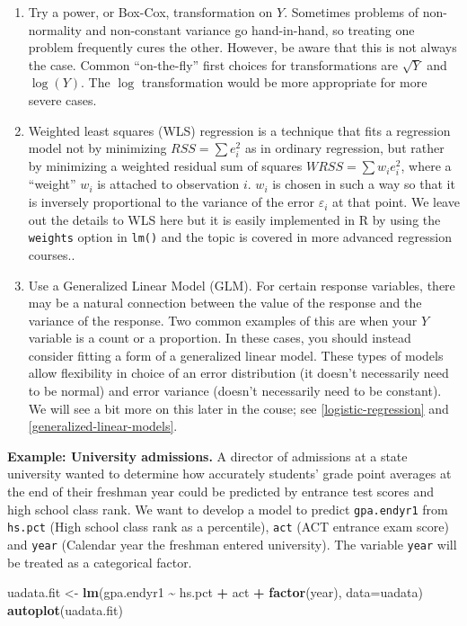 \documentclass[
]{book}
\newenvironment{Shaded}{\begin{snugshade}}{\end{snugshade}}
\newcommand{\AttributeTok}[1]{\textcolor[rgb]{0.13,0.29,0.53}{#1}}
\newcommand{\FunctionTok}[1]{\textcolor[rgb]{0.13,0.29,0.53}{\textbf{#1}}}
\newcommand{\NormalTok}[1]{#1}
\newcommand{\OtherTok}[1]{\textcolor[rgb]{0.56,0.35,0.01}{#1}}
\newcommand{\SpecialCharTok}[1]{\textcolor[rgb]{0.81,0.36,0.00}{\textbf{#1}}}
\begin{document}
\begin{enumerate}
\def\labelenumi{\arabic{enumi}.}
\item
  Try a power, or Box-Cox, transformation on \(Y\). Sometimes problems of non-normality and non-constant variance go hand-in-hand, so treating one problem frequently cures the other. However, be aware that this is not always the case. Common ``on-the-fly'' first choices for transformations are \(\sqrt{Y}\) and \(\log(Y)\). The \(\log\) transformation would be more appropriate for more severe cases.
\item
  Weighted least squares (WLS) regression is a technique that fits a regression model not by minimizing \(RSS = \sum e_i^2\) as in ordinary regression, but rather by minimizing a weighted residual sum of squares \(WRSS = \sum w_i e_i^2\), where a ``weight'' \(w_i\) is attached to observation \(i\). \(w_i\) is chosen in such a way so that it is inversely proportional to the variance of the error \(\varepsilon_i\) at that point. We leave out the details to WLS here but it is easily implemented in R by using the \texttt{weights} option in \texttt{lm()} and the topic is covered in more advanced regression courses..
\item
  Use a Generalized Linear Model (GLM). For certain response variables, there may be a natural connection between the value of the response and the variance of the response. Two common examples of this are when your \(Y\) variable is a count or a proportion. In these cases, you should instead consider fitting a form of a generalized linear model. These types of models allow flexibility in choice of an error distribution (it doesn't necessarily need to be normal) and error variance (doesn't necessarily need to be constant). We will see a bit more on this later in the couse; see \ref{logistic-regression} and \ref{generalized-linear-models}.
\end{enumerate}

\textbf{Example: University admissions.} A director of admissions at a state university wanted to determine how accurately students' grade point averages at the end of their freshman year could be predicted by entrance test scores and high school class rank. We want to develop a model to predict \texttt{gpa.endyr1} from \texttt{hs.pct} (High school class rank as a percentile), \texttt{act} (ACT entrance exam score) and \texttt{year} (Calendar year the freshman entered university). The variable \texttt{year} will be treated as a categorical factor.

\begin{Shaded}
\begin{Highlighting}[]
\NormalTok{uadata.fit }\OtherTok{\textless{}{-}} \FunctionTok{lm}\NormalTok{(gpa.endyr1 }\SpecialCharTok{\textasciitilde{}}\NormalTok{ hs.pct }\SpecialCharTok{+}\NormalTok{ act }\SpecialCharTok{+} \FunctionTok{factor}\NormalTok{(year), }\AttributeTok{data=}\NormalTok{uadata)}
\FunctionTok{autoplot}\NormalTok{(uadata.fit)}
\end{Highlighting}
\end{Shaded}
\end{document}
